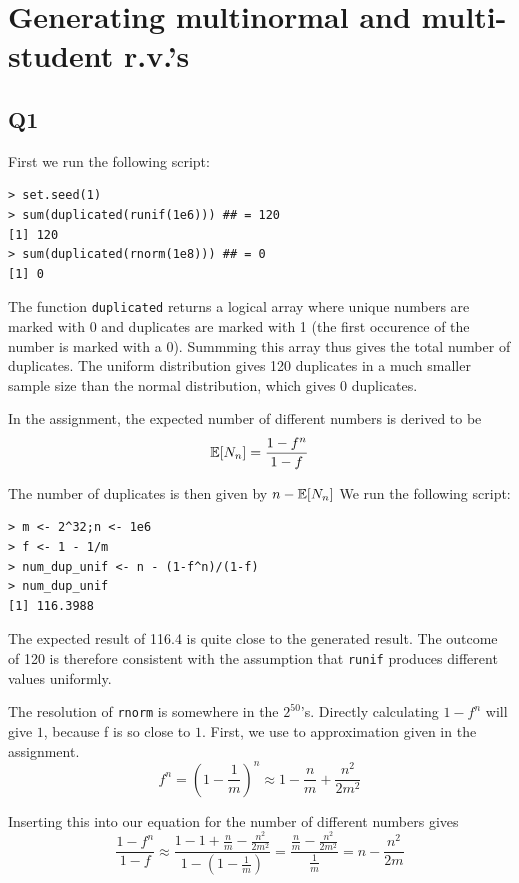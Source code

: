 \section*{Generating multinormal and multi-student r.v.'s}

\subsection*{Q1}

First we run the following script:

\begin{verbatim}
> set.seed(1)
> sum(duplicated(runif(1e6))) ## = 120
[1] 120
> sum(duplicated(rnorm(1e8))) ## = 0
[1] 0
\end{verbatim}

The function \verb|duplicated| returns a logical array where unique numbers are marked with 0 and duplicates are marked with 1 (the first occurence of the number is marked with a 0). Summming this array thus gives the total number of duplicates. The uniform distribution gives 120 duplicates in a much smaller sample size than the normal distribution, which gives 0 duplicates.

In the assignment, the expected number of different numbers is derived to be 
\begin{equation}
  \operatorname{\mathbb{E}}[N_n] = \frac{1 - f^n}{1-f}
\end{equation}

The number of duplicates is then given by 
$n - \operatorname{\mathbb{E}}[N_n]$
We run the following script:

\begin{verbatim}
> m <- 2^32;n <- 1e6
> f <- 1 - 1/m
> num_dup_unif <- n - (1-f^n)/(1-f)
> num_dup_unif
[1] 116.3988
\end{verbatim}

The expected result of 116.4 is quite close to the generated result. The outcome of 120 is therefore consistent with the assumption that \verb|runif| produces different values uniformly.

The resolution of \verb|rnorm| is somewhere in the $2^{50}$'s. Directly calculating $1 - f^n$ will give $1$, because f is so close to $1$.
First, we use to approximation given in the assignment.
\begin{equation}
f^n = \left( 1 - \frac{1}{m}\right)^n \approx 1 - \frac{n}{m} + \frac{n^2}{2m^2}
\end{equation}

Inserting this into our equation for the number of different numbers gives
\begin{equation}
\frac{1 - f^n}{1-f} \approx \frac{1 - 1 + \frac{n}{m} - \frac{n^2}{2m^2}}{1- \left(1 - \frac{1}{m}\right)}  = \frac{\frac{n}{m} - \frac{n^2}{2m^2}}{\frac{1}{m}} = n - \frac{n^2}{2m}
\end{equation}

